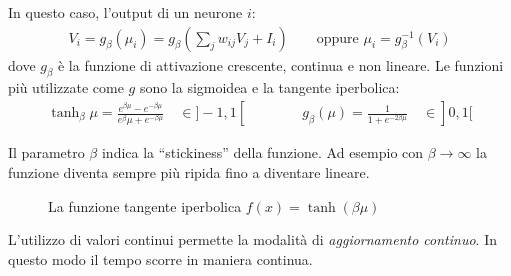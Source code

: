 In questo caso, l'output di un neurone $i$:
\begin{align}
    V_i = g_\beta(\mu_i) = g_\beta \left(\sum_{j} w_{ij} V_j + I_i \right) \qquad \text{oppure } \mu_i = g^{-1}_\beta(V_i) \label{eq:vi}
\end{align}
dove $g_\beta$ è la funzione di attivazione crescente, continua e non lineare. Le funzioni più utilizzate come $g$ sono la sigmoidea e la tangente iperbolica:
\begin{align*}
    \tanh_\beta \mu = \frac {e^{\beta\mu} - e^{-\beta\mu}} {e^\beta\mu + e^{-\beta\mu}} \quad\in ]-1,1[
    \qquad\qquad
    g_\beta(\mu) =\frac{1}{1 + e^{-2 \beta \mu}} \quad\in ]0,1[
\end{align*}

Il parametro $\beta$ indica la “stickiness” della funzione. Ad esempio con $\beta \rightarrow \infty$ la funzione diventa sempre più ripida fino a diventare lineare.\\

\begin{figure}[h!]
    \centering
    \caption{La funzione tangente iperbolica $f(x) = \tanh(\beta \mu)$}\label{fig:stickiness}
\end{figure}

\newpage

L'utilizzo di valori continui permette la modalità di \emph{aggiornamento continuo}. In questo modo il tempo scorre in maniera continua. 

